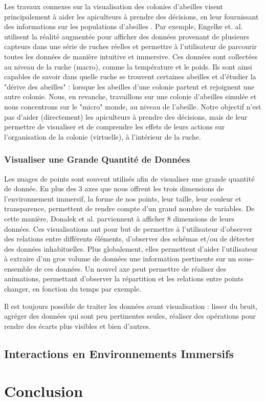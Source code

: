 	
		
		Les travaux connexes sur la visualisation des colonies d'abeilles visent principalement à aider les apiculteurs à prendre des décisions, en leur fournissant des informations sur les populations d'abeilles \cite{engelke_visual_2016, engelke_melissar_2016, nguyen_augmented_2017}. Par exemple, Engelke et. al. \cite{engelke_visual_2016} utilisent la réalité augmentée pour afficher des données provenant de plusieurs capteurs dans une série de ruches réelles et permettre à l'utilisateur de parcourir toutes les données de manière intuitive et immersive. Ces données sont collectées au niveau de la ruche (macro), comme la température et le poids. Ils sont ainsi capables de savoir dans quelle ruche se trouvent certaines abeilles et d'étudier la "dérive des abeilles" : lorsque les abeilles d'une colonie partent et rejoignent une autre colonie. Nous, en revanche, travaillons sur une colonie d'abeilles simulée et nous concentrons sur le "micro" monde, au niveau de l'abeille. Notre objectif n'est pas d'aider (directement) les apiculteurs à prendre des décisions, mais de leur permettre de visualiser et de comprendre les effets de leurs actions sur l'organisation de la colonie (virtuelle), à l'intérieur de la ruche.
	
	\subsubsection{Visualiser une Grande Quantité de Données}
	
	Les nuages de points sont souvent utilisés afin de visualiser une grande quantité de donnée. En plus des 3 axes que nous offrent les trois dimensions de l'environnement immersif, la forme de nos points, leur taille, leur couleur et transparence, permettent de rendre compte d'un grand nombre de variables. De cette manière, Donalek et al. \cite{donalek_immersive_2014} parviennent à afficher 8 dimensions de leurs données. Ces visualisations ont pour but de permettre à l'utilisateur d'observer des relations entre différents éléments, d'observer des schémas et/ou de détecter des données inhabituelles. Plus globalement, elles permettent d'aider l'utilisateur à extraire d'un gros volume de données une information pertinente sur un sous-ensemble de ces données. Un nouvel axe peut permettre de réaliser des animations, permettant d'observer la répartition et les relations entre points changer, en fonction du temps par exemple.
	
	Il est toujours possible de traiter les données avant visualisation : lisser du bruit, agréger des données qui sont peu pertinentes seules, réaliser des opérations pour rendre des écarts plus visibles et bien d'autres.
	
	\subsection{Interactions en Environnements Immersifs}			
	\section*{Conclusion}